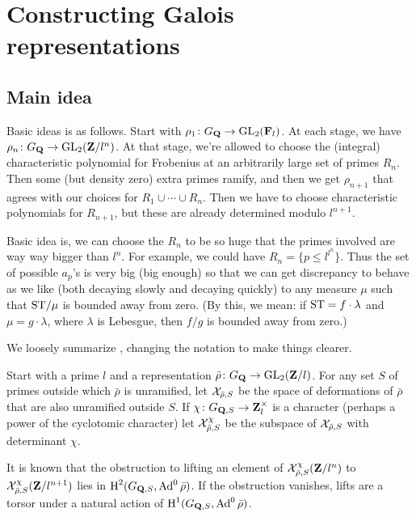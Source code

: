 
\chapter{Constructing Galois representations}





\section{Main idea}

Basic ideas is as follows. Start with $\rho_1\colon G_{\mathbf{Q}} \to \operatorname{GL}_2(\mathbf{F}_l)$. At 
each stage, we have $\rho_n\colon G_{\mathbf{Q}} \to \operatorname{GL}_2(\mathbf{Z}/l^n)$. At that stage, 
we're allowed to choose the (integral) characteristic polynomial for Frobenius 
at an arbitrarily large set of primes $R_n$. Then some (but density zero) extra 
primes ramify, and then we get $\rho_{n+1}$ that agrees with our choices for 
$R_1\cup \cdots \cup R_n$. Then we have to choose characteristic polynomials for 
$R_{n+1}$, but these are already determined modulo $l^{n+1}$. 

Basic idea is, we can choose the $R_n$ to be so huge that the primes involved are 
way way bigger than $l^n$. For example, we could have 
$R_n=\{p\leqslant l^{l^n}\}$. Thus the set of possible $a_p$'s is very big (big 
enough) so that we can get discrepancy to behave as we like (both decaying 
slowly and decaying quickly) to any measure $\mu$ such that $\mathrm{ST}/\mu$ is 
bounded away from zero. (By this, we mean: if $\mathrm{ST}=f\cdot\lambda$ and 
$\mu = g\cdot\lambda$, where $\lambda$ is Lebesgue, then $f/g$ is bounded away 
from zero.)

We loosely summarize \cite{pande-2011}, changing the notation to make things 
clearer. 

Start with a prime $l$ and a representation 
$\bar\rho\colon G_{\mathbf{Q}} \to \operatorname{GL}_2(\mathbf{Z}/l)$. For any set $S$ of primes outside 
which $\bar\rho$ is unramified, let $\mathcal{X}_{\bar\rho,S}$ be the space of 
deformations of $\bar\rho$ that are also unramified outside $S$. If 
$\chi\colon G_{\mathbf{Q},S} \to \mathbf{Z}_l^\times$ is a character (perhaps a power of the 
cyclotomic character) let $\mathcal{X}_{\bar\rho,S}^\chi$ be the subspace of 
$\mathcal{X}_{\bar\rho,S}$ with determinant $\chi$. 

It is known that the obstruction to lifting an element of 
$\mathcal{X}_{\bar\rho,S}^\chi(\mathbf{Z}/l^n)$ to $\mathcal{X}_{\bar\rho,S}^\chi(\mathbf{Z}/l^{n+1})$ lies 
in $\operatorname{H}^2(G_{\mathbf{Q},S},\operatorname{Ad}^0\bar\rho)$. If the obstruction vanishes, lifts are a
torsor under a natural action of $\operatorname{H}^1(G_{\mathbf{Q},S},\operatorname{Ad}^0\bar\rho)$. 

